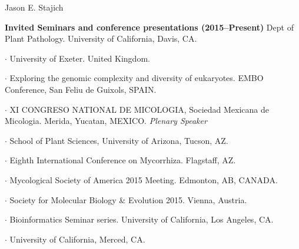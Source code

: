 \documentclass[10pt]{article}
\begin{document}
\begin{cv}{\centerline{Jason E. Stajich}}
\begin{cvlistcompact}{\bf Invited Seminars and conference presentations (2015--Present)}
    Dept of Plant Pathology. University of California, Davis,
    CA. 
  \item $\cdot$ %
    University of Exeter. United Kingdom.   
\item [2015] $\cdot$ %
  Exploring the genomic complexity and diversity of
  eukaryotes. EMBO Conference, San Feliu de Guixols, SPAIN. 
\item $\cdot$   %
  XI CONGRESO NATIONAL DE MICOLOGIA, Sociedad Mexicana de
  Micologia. Merida, Yucatan, MEXICO. {\it Plenary Speaker}
  \item $\cdot$ %
  School of Plant Sciences, University of Arizona, Tucson,
    AZ. 
  \item $\cdot$ %
    Eighth International Conference on Mycorrhiza.
    Flagstaff, AZ. 
  \item $\cdot$ %
    Mycological Society of America 2015 Meeting. Edmonton, AB, CANADA. 
  \item $\cdot$  %
    Society for Molecular Biology \& Evolution 2015. Vienna, Austria.
  \item $\cdot$  %
    Bioinformatics Seminar series. University of California, Los
    Angeles, CA.
  \item $\cdot$  %
    University of California, Merced, CA. 

\end{cvlistcompact}
\end{cv}
\end{document}
